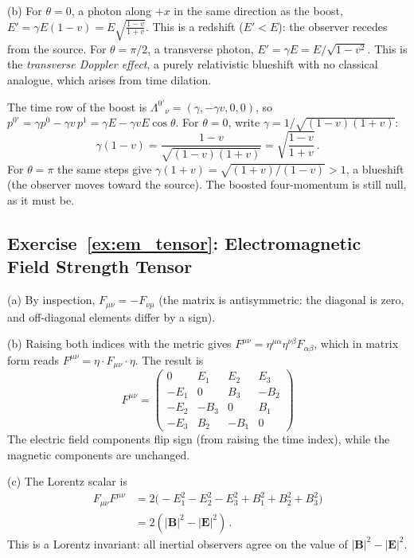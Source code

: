 (b) For $\theta = 0$, a photon along $+x$ in the same direction as the boost,
$E' = \gamma E(1-v) = E\sqrt{\frac{1-v}{1+v}}$.
This is a redshift ($E' < E$): the observer recedes from the source.
For $\theta = \pi/2$, a transverse photon,
$E' = \gamma E = E/\sqrt{1-v^2}$.
This is the \emph{transverse Doppler effect}, a purely relativistic
blueshift with no classical analogue, which arises from time dilation.

\begin{derivation}
The time row of the boost is $\Lambda^{0'}{}_{\nu} = (\gamma, -\gamma v, 0, 0)$, so
$p^{0'} = \gamma p^0 - \gamma v\,p^1 = \gamma E - \gamma v E\cos\theta$. For $\theta = 0$, write
$\gamma = 1/\sqrt{(1-v)(1+v)}$:
\[
    \gamma(1 - v) = \frac{1 - v}{\sqrt{(1-v)(1+v)}} = \sqrt{\frac{1-v}{1+v}} \,.
\]
For $\theta = \pi$ the same steps give $\gamma(1+v) = \sqrt{(1+v)/(1-v)} > 1$, a blueshift (the
observer moves toward the source). The boosted four-momentum is still null, as it must be.
\end{derivation}

\subsection*{Exercise~\ref{ex:em_tensor}: Electromagnetic Field Strength Tensor}

(a) By inspection, $F_{\mu\nu} = -F_{\nu\mu}$ (the matrix is
antisymmetric: the diagonal is zero, and off-diagonal elements differ by a sign).

(b) Raising both indices with the metric gives
$F^{\mu\nu} = \eta^{\mu\alpha}\eta^{\nu\beta}F_{\alpha\beta}$,
which in matrix form reads $F^{\mu\nu} = \eta \cdot F_{\mu\nu} \cdot \eta$.
The result is
\[
    F^{\mu\nu} =
    \begin{pmatrix}
    0 & E_1 & E_2 & E_3 \\
    -E_1 & 0 & B_3 & -B_2 \\
    -E_2 & -B_3 & 0 & B_1 \\
    -E_3 & B_2 & -B_1 & 0
    \end{pmatrix}
\]
The electric field components flip sign (from raising the time index),
while the magnetic components are unchanged.

(c) The Lorentz scalar is
\begin{align*}
    F_{\mu\nu}F^{\mu\nu}
    &= 2\bigl(-E_1^2 - E_2^2 - E_3^2 + B_1^2 + B_2^2 + B_3^2\bigr) \\
    &= 2(|\mathbf{B}|^2 - |\mathbf{E}|^2) \,.
\end{align*}
This is a Lorentz invariant: all inertial observers agree on the value of
$|\mathbf{B}|^2 - |\mathbf{E}|^2$.

